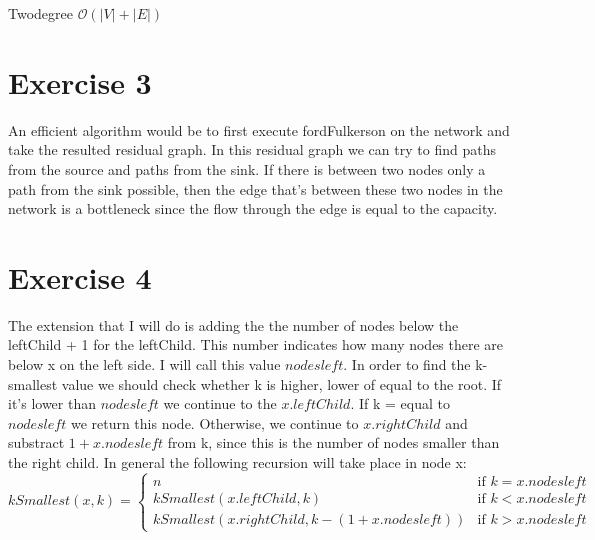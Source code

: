 \documentclass{article}
\newcommand{\bigO}{\mathcal{O}}
\begin{document}
\begin{algorithm}[h]
  \DontPrintSemicolon



    \caption{Twodegree $\bigO (|V| + |E|)$}
\end{algorithm}

\newpage
\section*{Exercise 3}
An efficient algorithm would be to first execute fordFulkerson on the network and take the resulted residual graph. In this residual graph we can try to find paths from the source and paths from the sink. If there is between two nodes only a path from the sink possible, then the edge that's between these two nodes in the network is a bottleneck since the flow through the edge is equal to the capacity.

\section*{Exercise 4}
The extension that I will do is adding the the number of nodes below the leftChild + 1 for the leftChild. This number indicates how many nodes there are below x on the left side. I will call this value $nodesleft$. In order to find the k-smallest value we should check whether k is higher, lower of equal to the root. If it's lower than $nodesleft$ we continue to the $x.leftChild$. If k = equal to $nodesleft$ we return this node. Otherwise, we continue to $x.rightChild$ and substract $1 + x.nodesleft$ from k, since this is the number of nodes smaller than the right child. In general the following recursion will take place in node x:
$$ kSmallest(x, k) =
\begin{cases}
  n &\mbox{if } k = x.nodesleft \\
  kSmallest(x.leftChild, k) &\mbox{if } k < x.nodesleft \\
  kSmallest(x.rightChild, k - (1 + x.nodesleft)) &\mbox{if } k > x.nodesleft
\end{cases}$$
\end{document}

